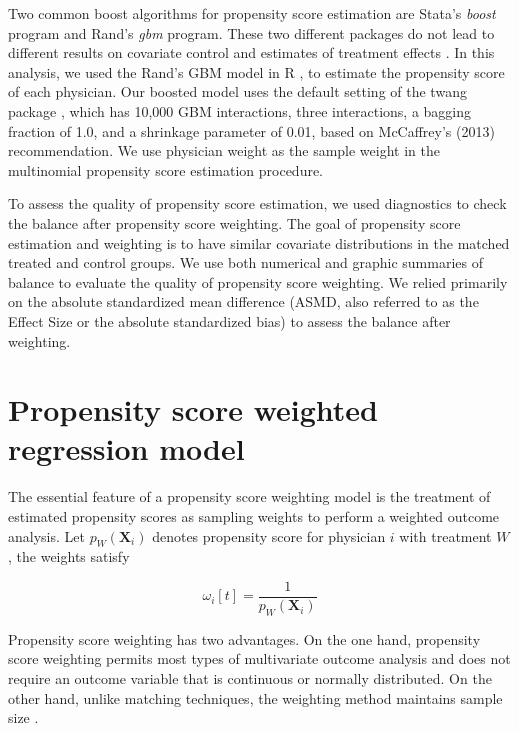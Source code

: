 \documentclass[12pt]{report}
\begin{document}
Two common boost algorithms for propensity score estimation are Stata's \textit{boost} program and Rand's \textit{gbm} program. These two different packages do not lead to different results on covariate control and estimates of treatment effects \citep{guo2014propensity}. In this analysis, we used the Rand's GBM model \citep{mccaffrey2004propensity} in R \citep{rbase}, to estimate the propensity score of each physician. Our boosted model uses the default setting of the twang package \citep{mccaffrey2013tutorial}, which has 10,000 GBM interactions, three interactions, a bagging fraction of 1.0, and a shrinkage parameter of 0.01, based on McCaffrey's (2013) recommendation. We use physician weight as the sample weight in the multinomial propensity score estimation procedure.

To assess the quality of propensity score estimation, we used diagnostics to check the balance after propensity score weighting. The goal of propensity score estimation and weighting is to have similar covariate distributions in the matched treated and control groups. We use both numerical and graphic summaries of balance to evaluate the quality of propensity score weighting. We relied primarily on the absolute standardized mean difference (ASMD, also referred to as the Effect Size or the absolute standardized bias) to assess the balance after weighting. 

\section{Propensity score weighted regression model}
\label{sec:model}
The essential feature of a propensity score weighting model is the treatment of estimated propensity scores as sampling weights to perform a weighted outcome analysis. Let  $p_W(\mathbf{X}_i)$ denotes propensity score for physician $i$ with treatment $W$, the weights satisfy

\begin{equation*}
\omega_i[t]=\frac{1}{p_W(\mathbf{X}_i)}
\end{equation*} 

Propensity score weighting has two advantages. On the one hand, propensity score weighting permits most types of multivariate outcome analysis and does not require an outcome variable that is continuous or normally distributed. On the other hand, unlike matching techniques, the weighting method maintains sample size \citep{guo2014propensity}.
\end{document}
